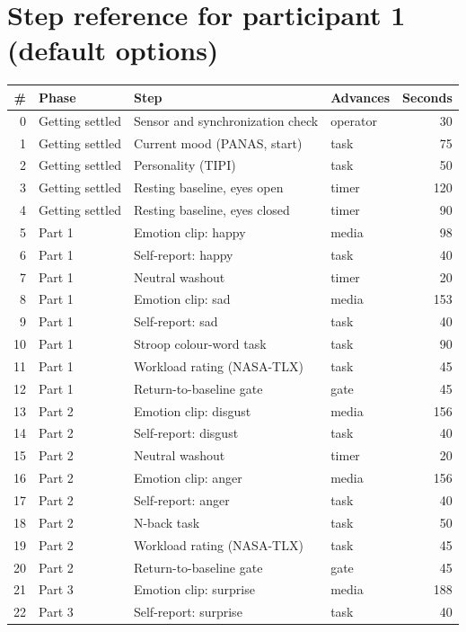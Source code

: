 \documentclass[11pt,a4paper]{article}
\begin{document}
\appendix
\section{Step reference for participant 1 (default options)}

\begin{longtable}{@{}rp{3.2cm}p{6.2cm}lr@{}}
\toprule
\textbf{\#} & \textbf{Phase} & \textbf{Step} & \textbf{Advances} & \textbf{Seconds} \\
\midrule\endhead
0 & Getting settled & Sensor and synchronization check & operator & 30 \\
1 & Getting settled & Current mood (PANAS, start) & task & 75 \\
2 & Getting settled & Personality (TIPI) & task & 50 \\
3 & Getting settled & Resting baseline, eyes open & timer & 120 \\
4 & Getting settled & Resting baseline, eyes closed & timer & 90 \\
5 & Part 1 & Emotion clip: happy & media & 98 \\
6 & Part 1 & Self-report: happy & task & 40 \\
7 & Part 1 & Neutral washout & timer & 20 \\
8 & Part 1 & Emotion clip: sad & media & 153 \\
9 & Part 1 & Self-report: sad & task & 40 \\
10 & Part 1 & Stroop colour-word task & task & 90 \\
11 & Part 1 & Workload rating (NASA-TLX) & task & 45 \\
12 & Part 1 & Return-to-baseline gate & gate & 45 \\
13 & Part 2 & Emotion clip: disgust & media & 156 \\
14 & Part 2 & Self-report: disgust & task & 40 \\
15 & Part 2 & Neutral washout & timer & 20 \\
16 & Part 2 & Emotion clip: anger & media & 156 \\
17 & Part 2 & Self-report: anger & task & 40 \\
18 & Part 2 & N-back task & task & 50 \\
19 & Part 2 & Workload rating (NASA-TLX) & task & 45 \\
20 & Part 2 & Return-to-baseline gate & gate & 45 \\
21 & Part 3 & Emotion clip: surprise & media & 188 \\
22 & Part 3 & Self-report: surprise & task & 40 \\

\end{longtable}
\end{document}
